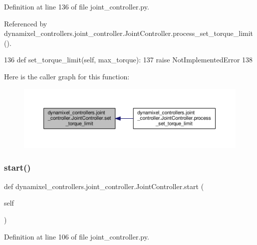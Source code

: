 Definition at line 136 of file joint\+\_\+controller.\+py.



Referenced by dynamixel\+\_\+controllers.\+joint\+\_\+controller.\+Joint\+Controller.\+process\+\_\+set\+\_\+torque\+\_\+limit().


\begin{DoxyCode}
136     \textcolor{keyword}{def }set\_torque\_limit(self, max\_torque):
137         \textcolor{keywordflow}{raise} NotImplementedError
138 
\end{DoxyCode}
Here is the caller graph for this function\+:
\nopagebreak
\begin{figure}[H]
\begin{center}
\leavevmode
\includegraphics[width=350pt]{d3/dcd/classdynamixel__controllers_1_1joint__controller_1_1_joint_controller_a653d0406d8655dc9d75f12e1a523ba89_icgraph}
\end{center}
\end{figure}
\mbox{\label{classdynamixel__controllers_1_1joint__controller_1_1_joint_controller_a8da16a8b801f868a4de7c68d6adc851f}} 
\subsubsection{\texorpdfstring{start()}{start()}}
{\footnotesize\ttfamily def dynamixel\+\_\+controllers.\+joint\+\_\+controller.\+Joint\+Controller.\+start (\begin{DoxyParamCaption}\item[{}]{self }\end{DoxyParamCaption})}



Definition at line 106 of file joint\+\_\+controller.\+py.




